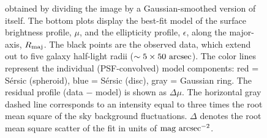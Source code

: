 \documentclass[useAMS,usenatbib,article]{mnras}
\begin{document}
\begin{figure}
\begin{center}
{obtained by dividing the image by a Gaussian-smoothed version of itself. 
The bottom plots display the best-fit model of the surface brightness profile, $\mu$, 
and the ellipticity profile, $\epsilon$, 
along the major-axis, $R_{\rm maj}$. 
The black points are the observed data, which extend out to five galaxy half-light radii ($\sim 5 \times 50~\rm arcsec$). 
The color lines represent the individual (PSF-convolved) model components: 
red = S\'ersic (spheroid), blue = S\'ersic (disc), gray = Gaussian ring. 
The residual profile (data $-$ model) is shown as $\Delta \mu$. 
The horizontal gray dashed line corresponds to an intensity equal to three times the root mean square of the sky background fluctuations. 
$\Delta$ denotes the root mean square scatter of the fit in units of $\rm mag~arcsec^{-2}$. }
\label{fig:n3115}
\end{center}
\end{figure}
\end{document}
